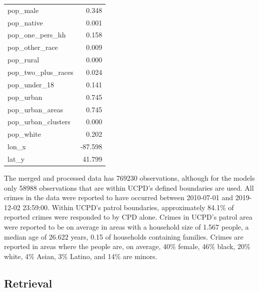 \documentclass{ucetd}
\begin{document}
\begin{table}
\begin{tabular}[t]{lr}
pop\_male & 0.348\\
\addlinespace
pop\_native & 0.001\\
pop\_one\_pers\_hh & 0.158\\
pop\_other\_race & 0.009\\
pop\_rural & 0.000\\
pop\_two\_plus\_races & 0.024\\
\addlinespace
pop\_under\_18 & 0.141\\
pop\_urban & 0.745\\
pop\_urban\_areas & 0.745\\
pop\_urban\_clusters & 0.000\\
pop\_white & 0.202\\
\addlinespace
lon\_x & -87.598\\
lat\_y & 41.799\\
\bottomrule
\end{tabular}
\end{table}

The merged and processed data has 769230 observations, although for the
models only 58988 observations that are within UCPD's defined boundaries
are used. All crimes in the data were reported to have occurred between
2010-07-01 and 2019-12-02 23:59:00. Within UCPD's patrol boundaries,
approximately 84.1\% of reported crimes were responded to by CPD alone.
Crimes in UCPD's patrol area were reported to be on average in areas
with a household size of 1.567 people, a median age of 26.622 years,
0.15 of households containing families. Crimes are reported in areas
where the people are, on average, 40\% female, 46\% black, 20\% white,
4\% Asian, 3\% Latino, and 14\% are minors.

\hypertarget{retrieval}{%
\subsection{Retrieval}\label{retrieval}}
\end{document}
